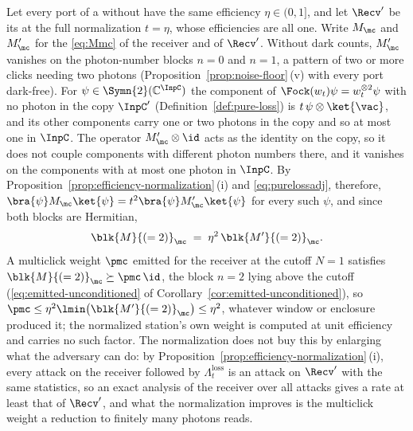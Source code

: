 
\begin{remark}\label{rem:normalization-gain}
Let every port of a  without
 have the same efficiency $\eta\in(0,1]$, and let
$\Recv'$ be its  at the full normalization
$t=\eta$, whose efficiencies are all one. Write $M_{\mc}$ and $M'_{\mc}$ for
the  \eqref{eq:Mmc} of the receiver and of $\Recv'$.
Without dark counts, $M'_{\mc}$ vanishes on the photon-number blocks $n=0$ and
$n=1$, a pattern of two or more clicks needing two photons
(Proposition~\ref{prop:noise-floor}\,(v) with every port dark-free). For
$\psi\in\Symn{2}(\mathbb{C}^{\InpC})$ the component of
$\Fock(w_t)\psi=w_t^{\otimes2}\psi$ with no photon in the copy $\InpC'$
(Definition~\ref{def:pure-loss}) is $t\,\psi\otimes\ket{\vac}$, and its other
components carry one or two photons in the copy and so at most one in
$\InpC$. The operator $M'_{\mc}\otimes\id$ acts as the identity on the copy,
so it does not couple components with different photon numbers there, and it
vanishes on the components with at most one photon in $\InpC$. By
Proposition~\ref{prop:efficiency-normalization}\,(i) and
\eqref{eq:purelossadj}, therefore,
$\bra{\psi}M_{\mc}\ket{\psi}=t^{2}\bra{\psi}M'_{\mc}\ket{\psi}$ for every
such $\psi$, and since both blocks are Hermitian,
\begin{equation}\label{eq:twophotonscaling}
  \blk{M}{(=2)}_{\mc}\;=\;\eta^{2}\,\blk{M'}{(=2)}_{\mc} .
\end{equation}
A multiclick weight $\pmc$ emitted for the receiver at the cutoff $N=1$
satisfies $\blk{M}{(=2)}_{\mc}\succeq\pmc\,\id$, the block $n=2$ lying above
the cutoff (\eqref{eq:emitted-unconditioned} of
Corollary~\ref{cor:emitted-unconditioned}), so
$\pmc\le\eta^{2}\lmin\big(\blk{M'}{(=2)}_{\mc}\big)\le\eta^{2}$, whatever
window or enclosure produced it; the normalized station's own weight is
computed at unit efficiency and carries no such factor. The normalization
does not buy this by enlarging what the adversary can do: by
Proposition~\ref{prop:efficiency-normalization}\,(i), every attack on the
receiver followed by $\Lambda^{\mathrm{loss}}_t$ is an attack on $\Recv'$
with the same statistics, so an exact analysis of the receiver over all
attacks gives a rate at least that of $\Recv'$, and what the normalization
improves is the multiclick weight a reduction to finitely many photons reads.
\end{remark}

